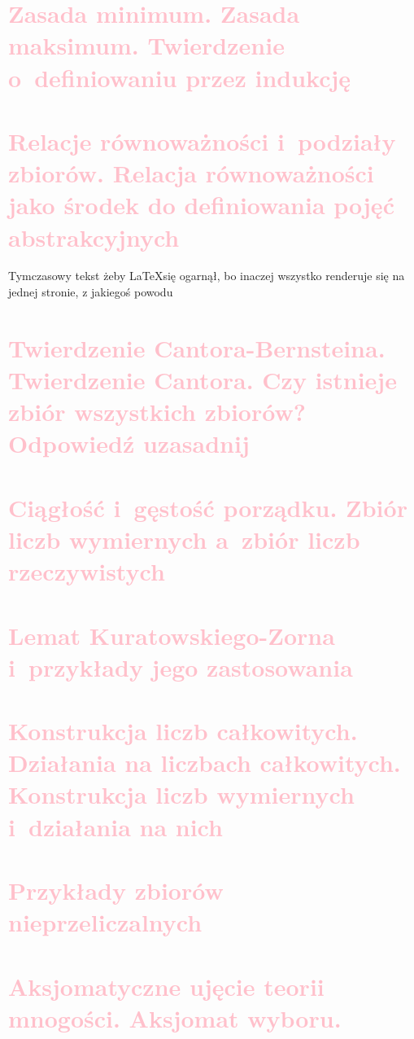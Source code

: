 \section{\textcolor{pink}{Zasada minimum. Zasada maksimum. Twierdzenie o~definiowaniu przez indukcję}}

\section{\textcolor{pink}{Relacje równoważności i~podziały zbiorów. Relacja równoważności jako środek do definiowania pojęć abstrakcyjnych}}

Tymczasowy tekst żeby \LaTeX się ogarnął, bo inaczej wszystko renderuje się na jednej stronie, z jakiegoś powodu

\section{\textcolor{pink}{Twierdzenie Cantora-Bernsteina. Twierdzenie Cantora. Czy istnieje zbiór wszystkich zbiorów? Odpowiedź uzasadnij}}


\section{\textcolor{pink}{Ciągłość i~gęstość porządku. Zbiór liczb wymiernych a~zbiór liczb rzeczywistych}}

\section{\textcolor{pink}{Lemat Kuratowskiego-Zorna i~przykłady jego zastosowania}}

\section{\textcolor{pink}{Konstrukcja liczb całkowitych. Działania na liczbach całkowitych. Konstrukcja liczb wymiernych i~działania na nich}}

\section{\textcolor{pink}{Przykłady zbiorów nieprzeliczalnych}}

\section{\textcolor{pink}{Aksjomatyczne ujęcie teorii mnogości. Aksjomat wyboru.}}

